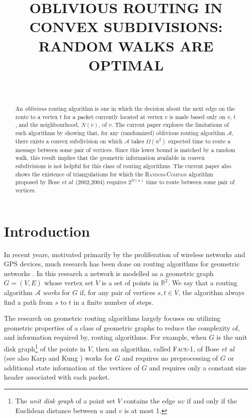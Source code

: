 \documentclass [letterpaper] {patmorin}
\title{\MakeUppercase{Oblivious Routing in Convex Subdivisions: \newline 
       Random Walks are Optimal}}
\author{\ }
\newcommand{\R}{\mathbb{R}}
\newcommand{\etal}{\emph{et al}}
\begin{document}
\maketitle

\begin{abstract}
An \emph{oblivious} routing algorithm is one in which the decision about
the next edge on the route to a vertex $t$ for a packet currently located
at vertex $v$ is made based only on $v$, $t$, and the neighbourhood,
$N(v)$, of $v$.  The current paper explores the limitations of such
algorithms by showing that, for any (randomized) oblivious routing
algorithm $\mathcal{A}$, there exists a convex subdivision on which
$\mathcal{A}$ takes $\Omega(n^2)$ expected time to route a message between
some pair of vertices.  Since this lower bound is matched by a random walk,
this result implies that the geometric information available in convex
subdivisions is not helpful for this class of routing algorithms.
The current paper also shows the existence of triangulations for which the
\textsc{Random-Compass} algorithm proposed by Bose \etal\ (2002,2004)
requires $2^{\Omega(n)}$ time to route between some pair of vertices.


\end{abstract}

\section{Introduction}
\label{sec:intro}

In recent years, motivated primarily by the proliferation of wireless networks and GPS devices, much research has been done on routing algorithms for geometric networks \cite{gior03}.  In this research a network is modelled as a geometric graph $G=(V,E)$ whose vertex set $V$ is a set of points in $\R^2$. We say that a routing algorithm $\mathcal{A}$ \emph{works} for $G$ if, for any pair of vertices $s,t\in V$, the algorithm always find a path from $s$ to $t$ in a finite number of steps.

The research on geometric routing algorithms largely focuses on utilizing geometric properties of a class of geometric graphs to reduce the complexity of, and information required by, routing algorithms.  For example, when $G$ is the unit disk graph\footnote{The \emph{unit disk graph} of a point set $V$ contains the edge $uv$ if and only if the Euclidean distance between $u$ and $v$ is at most 1.} of the points in $V$, then an algorithm, called \textsc{Face-1}, of Bose \etal\ \cite{bose01} (see also Karp and Kung \cite{kk00}) works for $G$ and requires no preprocessing of $G$ or additional state information at the vertices of $G$ and requires only a constant size header associated with each packet.
\end{document}
